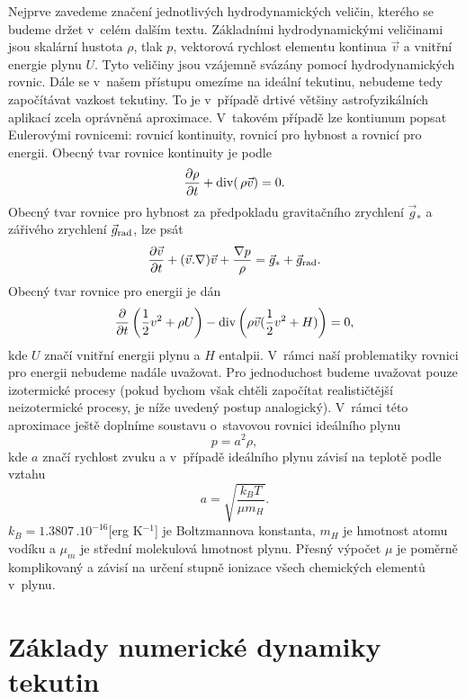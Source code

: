 Nejprve zavedeme značení jednotlivých hydrodynamických veličin, kterého se budeme držet v~celém dalším textu. Základními hydrodynamickými veličinami jsou skalární hustota $\rho$, tlak $p$, vektorová rychlost elementu kontinua $\vec{v}$ a vnitřní energie plynu $U$. Tyto veličiny jsou vzájemně svázány pomocí hydrodynamických rovnic. Dále se v~našem přístupu omezíme na ideální tekutinu, nebudeme tedy započítávat vazkost tekutiny. To je v~případě drtivé většiny astrofyzikálních aplikací zcela oprávněná aproximace. V~takovém případě lze kontiunum popsat Eulerovými rovnicemi: rovnicí kontinuity, rovnicí pro hybnost a rovnicí pro energii. Obecný tvar rovnice kontinuity je podle {\citep{Landau}}
\begin{eqnarray}
		\frac{\partial{\rho}}{\partial{t}}+{\rm div}({\, \rho \vec v})=0.
		\label{konti}
\end{eqnarray} 
Obecný tvar rovnice pro hybnost za předpokladu gravitačního zrychlení $\vec{g}_*$ a 
zářivého zrychlení $\vec{g}_{\rm rad}$, lze psát 
\begin{eqnarray}
	\label{hybnost}
	\frac{\partial \vec{v}}{\partial{t}}+(\vec{v}.\nabla )\vec{v}
		+\frac{\nabla p}{\rho} = \vec{g}_*+\vec{g}_{\rm rad}.
\end{eqnarray}
Obecný tvar rovnice pro energii je dán
	\begin{eqnarray}
	\label{energie}
		\frac{\partial }{\partial{t}}\left(\frac{1}{2}v^2+\rho U\right)-{\rm div}\left(\rho\vec{v}(\frac{1}{2}v^2+H)\right)=0,
	\end{eqnarray}
kde $U$ značí vnitřní energii plynu a $H$ entalpii. V~rámci naší problematiky rovnici pro energii nebudeme nadále uvažovat. Pro jednoduchost budeme uvažovat pouze izotermické procesy (pokud bychom však chtěli započítat realističtější neizotermické procesy, je  níže uvedený postup analogický). V~rámci této aproximace ještě doplníme soustavu o~stavovou rovnici ideálního plynu
\begin{equation}
\label{staveq}
p=a^2\rho,
\end{equation}
kde $a$ značí rychlost zvuku a v~případě ideálního plynu závisí na teplotě podle vztahu
\begin{equation}
\label{soundspeed} 
a=\sqrt{\frac{k_B T}{\mu m_H}}.
\end{equation}
$k_B=1.3807\, .10^{-16}$[erg K$^{-1}$] je Boltzmannova konstanta, $m_{H}$ je hmotnost atomu vodíku a $\mu_{m}$ je střední molekulová hmotnost plynu. Přesný výpočet $\mu$ je poměrně komplikovaný a závisí na určení stupně ionizace všech chemických elementů v~plynu.
\section{Základy numerické dynamiky tekutin}
